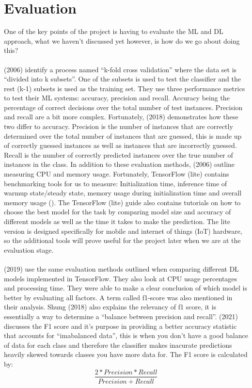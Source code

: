 \documentclass{article}
\begin{document}
\section{Evaluation}
One of the key points of the project is having to evaluate the ML and DL approach, what we haven’t discussed 
yet however, is how do we go about doing this?
\\
\\
\citeauthor{10.1145/1163593.1163596} (2006) identify a process named “k-fold cross validation” where the data set is “divided 
into k subsets”. One of the subsets is used to test the classifier and the rest (k-1) subsets is used as the training 
set. They use three performance metrics to test their ML systems: accuracy, precision and recall. Accuracy being the 
percentage of correct decisions over the total number of test instances. Precision and recall are a bit more complex. 
Fortunately, \citeauthor{shung2018} (2018) demonstrates how these two differ to accuracy. Precision is the number of instances that are 
correctly determined over the total number of instances that are guessed, this is made up of correctly guessed instances
 as well as instances that are incorrectly guessed. Recall is the number of correctly predicted instances over the true 
 number of instances in the class. In addition to these evaluation methods, \citeauthor{10.1145/1163593.1163596} (2006) 
 outline measuring CPU and memory usage. Fortunately, TensorFlow (lite) contains benchmarking tools for us to measure: 
 Initialization time, inference time of warmup state/steady state, memory usage during initialization time and overall 
 memory usage (\cite{googleTF}). The TensorFlow (lite) guide also contains tutorials on how to choose the best model for 
 the task by comparing model size and accuracy of different models as well as the time it takes to make the prediction. 
 The lite version is designed specifically for mobile and internet of things (IoT) hardware, so the additional tools 
 will prove useful for the project later when we are at the evaluation stage.
 \\
 \\
 \citeauthor{Chockwanich} (2019) use the same evaluation methods outlined when comparing different DL models 
 implemented in TensorFlow. They also look at CPU usage percentages and processing time. They were able to make a clear 
 conclusion of which model is better by evaluating all factors. A term called f1-score was also mentioned in their 
 analysis. Shung (2018) also explains the relevancy of f1 score, it is essentially a way to determine a “balance between
  precision and recall”. \citeauthor{kors2021} (2021) discusses the F1 score and it’s purpose in providing a better accuracy 
  statistic that accounts for “imabalanced data”, this is when you don’t have a good balance of data for each class and 
  therefore the classifier makes inacurate predictions heavily skewed towards classes you have more data for. The F1 
  score is calculated by:
\[\frac{2*Precision*Recall}{Precision + Recall}\]
\end{document}
